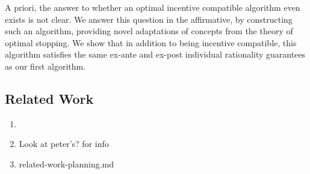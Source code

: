 A priori,
the answer to whether an optimal incentive compatible algorithm even exists is not clear. We answer this question
in the affirmative, by constructing such an algorithm, providing novel adaptations of concepts from the theory 
of optimal stopping. 
We show that in addition to being incentive compatible,
this algorithm satisfies the same ex-ante and ex-post individual rationality guarantees as our first algorithm.




\subsection{Related Work}

\begin{enumerate}
    \item {}
    \item Look at peter's? for info
    \item related-work-planning.md
\end{enumerate}  